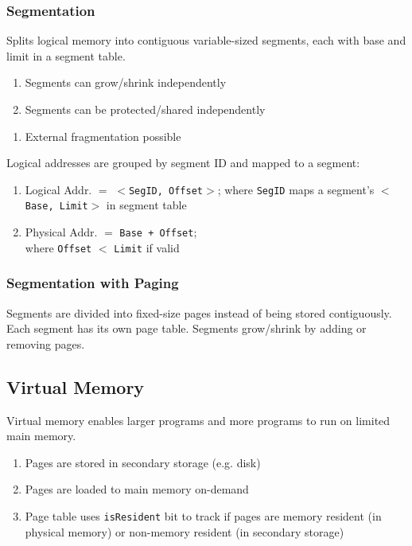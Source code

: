 \documentclass[12pt, a4paper]{article}
\begin{document}
\begin{multicols*}{3}
\subsubsection{Segmentation}
Splits logical memory into contiguous variable-sized segments, each with base and limit in a segment table.
\begin{enumerate}[$+$]
  \item Segments can grow/shrink independently 
  \item Segments can be protected/shared independently
\end{enumerate}\vspace{-1pt}
\begin{enumerate}[$-$]
  \item External fragmentation possible
\end{enumerate}

Logical addresses are grouped by segment ID and mapped to a segment:
\begin{enumerate}[\roman*.]
  \item Logical Addr. $=$ $<$\lstinline|SegID, Offset|$>$; where \lstinline|SegID| maps a segment's $<$\lstinline|Base, Limit|$>$ in segment table
  \item Physical Addr. $=$ \lstinline|Base + Offset|;\\where \lstinline|Offset| $<$ \lstinline|Limit| if valid
\end{enumerate}
{\centering{}\par}
\vspace{-1em}
\subsubsection{Segmentation with Paging}
Segments are divided into fixed-size pages instead of being stored contiguously. Each segment has its own page table. Segments grow/shrink by adding or removing pages.

{\centering{}\par}
\vspace{-1em}
\colbreak
\subsection{Virtual Memory}
Virtual memory enables larger programs and more programs to run on limited main memory.
\begin{enumerate}[\roman*.]
  \item Pages are stored in secondary storage (e.g. disk)
  \item Pages are loaded to main memory on-demand
  \item Page table uses \lstinline|isResident| bit to track if pages are memory resident (in physical memory) or non-memory resident (in secondary storage)
\end{enumerate}


\end{multicols*}
\end{document}
